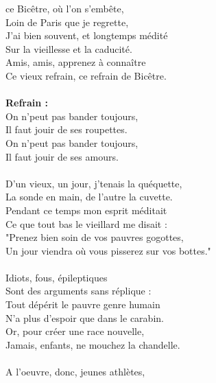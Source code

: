 
 ce Bicêtre, où l'on s'embête,
\\Loin de Paris que je regrette,
\\J'ai bien souvent, et longtemps médité
\\Sur la vieillesse et la caducité.
\\Amis, amis, apprenez à connaître
\\Ce vieux refrain, ce refrain de Bicêtre.
\\\\\textbf{Refrain :}
\\On n'peut pas bander toujours,
\\Il faut jouir de ses roupettes.
\\On n'peut pas bander toujours,
\\Il faut jouir de ses amours.
\\\\D'un vieux, un jour, j'tenais la quéquette,
\\La sonde en main, de l'autre la cuvette.
\\Pendant ce temps mon esprit méditait
\\Ce que tout bas le vieillard me disait :
\\"Prenez bien soin de vos pauvres gogottes,
\\Un jour viendra où vous pisserez sur vos bottes."
\\\\Idiots, fous, épileptiques
\\Sont des arguments sans réplique :
\\Tout dépérit le pauvre genre humain
\\N'a plus d'espoir que dans le carabin.
\\Or, pour créer une race nouvelle,
\\Jamais, enfants, ne mouchez la chandelle.
\\\\A l'oeuvre, donc, jeunes athlètes,
